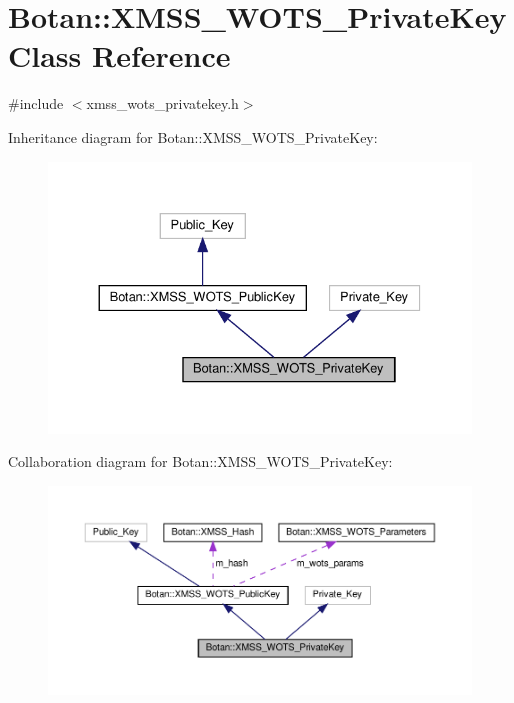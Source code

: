\hypertarget{class_botan_1_1_x_m_s_s___w_o_t_s___private_key}{}\section{Botan\+:\+:X\+M\+S\+S\+\_\+\+W\+O\+T\+S\+\_\+\+Private\+Key Class Reference}
\label{class_botan_1_1_x_m_s_s___w_o_t_s___private_key}


{\ttfamily \#include $<$xmss\+\_\+wots\+\_\+privatekey.\+h$>$}



Inheritance diagram for Botan\+:\+:X\+M\+S\+S\+\_\+\+W\+O\+T\+S\+\_\+\+Private\+Key\+:
\nopagebreak
\begin{figure}[H]
\begin{center}
\leavevmode
\includegraphics[width=330pt]{class_botan_1_1_x_m_s_s___w_o_t_s___private_key__inherit__graph}
\end{center}
\end{figure}


Collaboration diagram for Botan\+:\+:X\+M\+S\+S\+\_\+\+W\+O\+T\+S\+\_\+\+Private\+Key\+:
\nopagebreak
\begin{figure}[H]
\begin{center}
\leavevmode
\includegraphics[width=350pt]{class_botan_1_1_x_m_s_s___w_o_t_s___private_key__coll__graph}
\end{center}
\end{figure}
